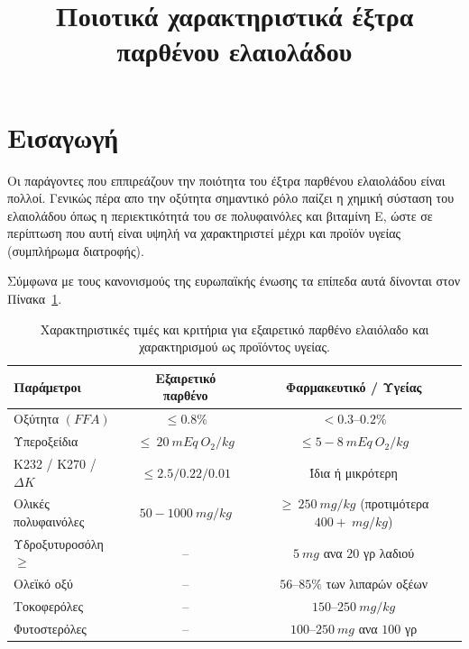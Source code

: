 \documentclass[12pt,a4paper]{article}
\title{Ποιοτικά χαρακτηριστικά έξτρα παρθένου ελαιολάδου}
\begin{document}
\maketitle
\section*{Εισαγωγή}
Οι παράγοντες που εππιρεάζουν την ποιότητα του έξτρα παρθένου ελαιολάδου είναι πολλοί.
Γενικώς πέρα απο την οξύτητα σημαντικό ρόλο παίζει η χημική σύσταση του ελαιολάδου όπως η περιεκτικότητά του σε πολυφαινόλες και βιταμίνη Ε, ώστε σε περίπτωση που αυτή είναι υψηλή να χαρακτηριστεί μέχρι και προϊόν υγείας (συμπλήρωμα διατροφής).

Σύμφωνα με τους κανονισμούς της ευρωπαϊκής ένωσης τα επίπεδα αυτά δίνονται στον Πίνακα~\ref{table:health}.
\begin{table}[h!]
	\centering
	\begin{tabular}{|l|c|c|}
		\hline
		\textbf{Παράμετροι} & \textbf{Εξαιρετικό παρθένο} & \textbf{Φαρμακευτικό / Υγείας} \\
		\hline
		Οξύτητα $(FFA)$ & $\leq 0.8\%$ & $< 0.3$–$0.2\%$ \\
		\hline
		Υπεροξείδια & $\leq ~20 ~mEq ~O_2/kg$ & $\leq 5-8 ~mEq~ O_2/kg$ \\
		\hline
		K232 / K270 / $\Delta K$ & $\leq 2.5 / 0.22 / 0.01$ & Ίδια ή μικρότερη \\
		\hline
		Ολικές πολυφαινόλες & $50-1000 ~ mg/kg$ & $\geq ~250 ~mg/kg$ (προτιμότερα $400+ ~mg/kg$) \\
		\hline
		Υδροξυτυροσόλη $\geq$ & – & $5 ~ mg$ ανα $20$ γρ λαδιού \\
		\hline
		Ολεϊκό οξύ & – & $56$–$85\%$ των λιπαρών οξέων \\
		\hline
		Τοκοφερόλες & – & $150$–$250~ mg/kg$ \\
		\hline
		Φυτοστερόλες & – & $100$–$250~ mg$ ανα $100$ γρ \\
		\hline
	\end{tabular}
	\caption{Χαρακτηριστικές τιμές και κριτήρια για εξαιρετικό παρθένο ελαιόλαδο και χαρακτηρισμού ως προϊόντος υγείας.}
	\label{table:health}
\end{table}
\end{document}
